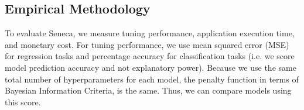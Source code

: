 





\subsection{Empirical Methodology}

To evaluate Seneca, we measure tuning performance, application execution time,
and monetary cost.  For tuning performance, we use mean squared error (MSE)
for regression tasks and percentage accuracy for classification tasks (i.e. we score
model prediction accuracy and not explanatory power).  Because we use the same 
total number of hyperparameters for each model, the penalty function in terms of 
Bayesian Information Criteria, is the same. Thus, we can compare models using
this score.

